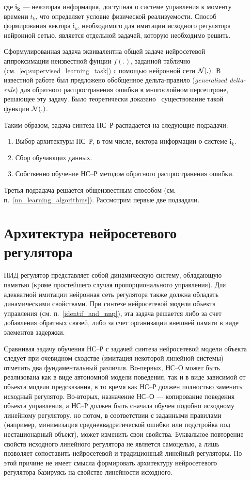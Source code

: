 \noindent где $\mathbf{i_k}$ --- некоторая информация, доступная о
системе управления к моменту времени $t_k$, что определяет условие
физической реализуемости.  Способ формирования вектора $\mathbf{i}_k$,
необходимого для имитации исходного регулятора нейронной сетью,
является отдельной задачей, которую необходимо решить.

Сформулированная задача эквивалентна общей задаче нейросетевой
аппроксимации неизвестной фунции $f(.)$, заданной таблично
(см.~\eqref{eq:supervised_learning_task}) с помощью нейронной сети
$\mathcal{N}(.)$.  В известной работе \cite{rumelhart86} был предложено
обобщенное дельта-правило ({\em generalized delta-rule}) для обратного
распространения ошибки в многослойном персептроне, решающее эту
задачу.  Было теоретически доказано~\cite{XXX}
существование такой функции $\mathcal{N}(.)$.

Таким образом, задача синтеза НС--Р распадается на следующие
подзадачи:
\begin{enumerate}
\item Выбор архитектуры НС--Р, в том числе, вектора информации о
  системе $\mathbf{i}_k$.
\item Сбор обучающих данных.
\item Собственно обучение НС--Р методом обратного распространения
  ошибки.
\end{enumerate}

Третья подзадача решается общеизвестным способом
(см. п.~\ref{nn_learning_algorithms}).  Рассмотрим первые две
подзадачи.

\section{Архитектура нейросетевого регулятора}

ПИД регулятор представляет собой динамическую систему, обладающую
памятью (кроме простейшего случая пропорционального управления).  Для
адекватной имитации нейронная сеть регулятора также должна обладать
динамическими свойствами.  При синтезе нейросетевой модели объекта
управления (см. п.~\ref{identif_and_nnp}), эта задача решается либо за
счет добавления обратных связей, либо за счет организации внешней
памяти в виде элементов задержки.

Сравнивая задачу обучения НС--Р с задачей синтеза нейросетевой модели
объекта следует при очевидном сходстве (имитация некоторой линейной
системы) отметить два фундаментальный различия.  Во-первых, НС--О
может быть реализована как в виде автономной модели поведения, так и в
виде зависимой от объекта модели предсказания, в то время как НС--Р
должен полностью заменить исходный регулятор.  Во-вторых, назначение
НС--О --- копирование поведения объекта управления, а НС--Р должен
быть сначала обучен подобно исходному линейному регулятору, но потом,
в соответствии с заданными правилами (например, минимизация
среднеквадратической ошибки или подстройка под нестационарный объект),
может изменить свои свойства.  Буквальное повторение свойств исходного
линейного регулятора не является самоцелью, а лишь позволяет
сопоставить нейросетевой и традиционный линейный регуляторы.  По этой
причине не имеет смысла формировать архитектуру нейросетевого
регулятора базируясь на свойстве линейности исходного.

